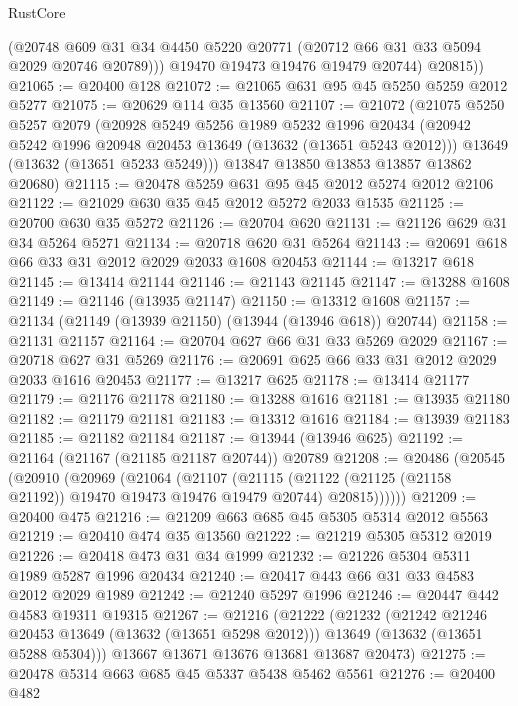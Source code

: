 \begin{lexlean}{RustCore}
\begin{coremodule}
            (@20748 @609 @31 @34 @4450 @5220 @20771 (@20712 @66 @31 @33 @5094 @2029 @20746 @20789)))
          @19470
          @19473
          @19476
          @19479
          @20744)
        @20815))
@21065 := @20400 @128
@21072 := @21065 @631 @95 @45 @5250 @5259 @2012 @5277
@21075 := @20629 @114 @35 @13560
@21107 := @21072
    (@21075
      @5250
      @5257
      @2079
      (@20928
        @5249
        @5256
        @1989
        @5232
        @1996
        @20434
        (@20942 @5242 @1996 @20948 @20453 @13649 (@13632 (@13651 @5243 @2012)))
        @13649
        (@13632 (@13651 @5233 @5249)))
      @13847
      @13850
      @13853
      @13857
      @13862
      @20680)
@21115 := @20478 @5259 @631 @95 @45 @2012 @5274 @2012 @2106
@21122 := @21029 @630 @35 @45 @2012 @5272 @2033 @1535
@21125 := @20700 @630 @35 @5272
@21126 := @20704 @620
@21131 := @21126 @629 @31 @34 @5264 @5271
@21134 := @20718 @620 @31 @5264
@21143 := @20691 @618 @66 @33 @31 @2012 @2029 @2033 @1608 @20453
@21144 := @13217 @618
@21145 := @13414 @21144
@21146 := @21143 @21145
@21147 := @13288 @1608
@21149 := @21146 (@13935 @21147)
@21150 := @13312 @1608
@21157 := @21134 (@21149 (@13939 @21150) (@13944 (@13946 @618)) @20744)
@21158 := @21131 @21157
@21164 := @20704 @627 @66 @31 @33 @5269 @2029
@21167 := @20718 @627 @31 @5269
@21176 := @20691 @625 @66 @33 @31 @2012 @2029 @2033 @1616 @20453
@21177 := @13217 @625
@21178 := @13414 @21177
@21179 := @21176 @21178
@21180 := @13288 @1616
@21181 := @13935 @21180
@21182 := @21179 @21181
@21183 := @13312 @1616
@21184 := @13939 @21183
@21185 := @21182 @21184
@21187 := @13944 (@13946 @625)
@21192 := @21164 (@21167 (@21185 @21187 @20744)) @20789
@21208 := @20486
    (@20545
      (@20910
        (@20969
          (@21064
            (@21107
              (@21115
                (@21122 (@21125 (@21158 @21192)) @19470 @19473 @19476 @19479 @20744)
                @20815))))))
@21209 := @20400 @475
@21216 := @21209 @663 @685 @45 @5305 @5314 @2012 @5563
@21219 := @20410 @474 @35 @13560
@21222 := @21219 @5305 @5312 @2019
@21226 := @20418 @473 @31 @34 @1999
@21232 := @21226 @5304 @5311 @1989 @5287 @1996 @20434
@21240 := @20417 @443 @66 @31 @33 @4583 @2012 @2029 @1989
@21242 := @21240 @5297 @1996
@21246 := @20447 @442 @4583 @19311 @19315
@21267 := @21216
    (@21222
      (@21232
        (@21242 @21246 @20453 @13649 (@13632 (@13651 @5298 @2012)))
        @13649
        (@13632 (@13651 @5288 @5304)))
      @13667
      @13671
      @13676
      @13681
      @13687
      @20473)
@21275 := @20478 @5314 @663 @685 @45 @5337 @5438 @5462 @5561
@21276 := @20400 @482

\end{coremodule}
\end{lexlean}
